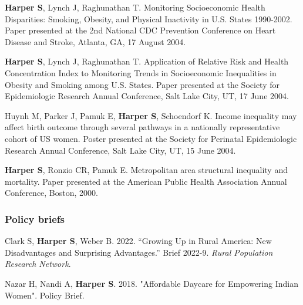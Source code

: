 \documentclass[
  letterpaper,
  DIV=11,
  numbers=noendperiod]{scrartcl}
\begin{document}
\textbf{Harper S}, Lynch J, Raghunathan T. Monitoring Socioeconomic
Health Disparities: Smoking, Obesity, and Physical Inactivity in U.S.
States 1990-2002. Paper presented at the 2nd National CDC Prevention
Conference on Heart Disease and Stroke, Atlanta, GA, 17 August 2004.

\textbf{Harper S}, Lynch J, Raghunathan T. Application of Relative Risk
and Health Concentration Index to Monitoring Trends in Socioeconomic
Inequalities in Obesity and Smoking among U.S. States. Paper presented
at the Society for Epidemiologic Research Annual Conference, Salt Lake
City, UT, 17 June 2004.

Huynh M, Parker J, Pamuk E, \textbf{Harper S}, Schoendorf K. Income
inequality may affect birth outcome through several pathways in a
nationally representative cohort of US women. Poster presented at the
Society for Perinatal Epidemiologic Research Annual Conference, Salt
Lake City, UT, 15 June 2004.

\textbf{Harper S}, Ronzio CR, Pamuk E. Metropolitan area structural
inequality and mortality. Paper presented at the American Public Health
Association Annual Conference, Boston, 2000.

\subsubsection{Policy briefs}\label{policy-briefs}

Clark S, \textbf{Harper S}, Weber B. 2022. ``Growing Up in Rural
America: New Disadvantages and Surprising Advantages.'' Brief 2022-9.
\emph{Rural Population Research Network}.

Nazar H, Nandi A, \textbf{Harper S}. 2018. "Affordable Daycare for
Empowering Indian Women". Policy Brief.
\end{document}

